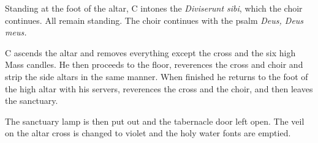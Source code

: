 {\rubric Standing at the foot of the altar, C intones the \textit{Diviserunt
sibi}, which the choir continues. All remain standing. The choir continues with
the psalm \textit{Deus, Deus meus.}

\rubric C ascends the altar and removes everything except the cross and the six
high Mass candles. He then proceeds to the floor, reverences the cross and
choir and strip the side altars in the same manner. When finished he returns to
the foot of the high altar with his servers, reverences the cross and the
choir, and then leaves the sanctuary.

\rubric The sanctuary lamp is then put out and the tabernacle door left open.
The veil on the altar cross is changed to violet and the holy water fonts are
emptied.

}
